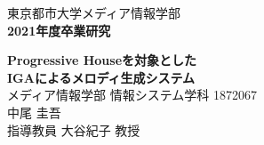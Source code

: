 \documentclass[fleqn,11pt]{jreport}
\begin{document}
\baselineskip 21.5pt

\begin{titlepage}
	\vspace*{3cm}
	\begin{center}
		{\Large\gt 東京都市大学メディア情報学部}\\
		\vspace*{0.5cm}
		{\Large\bf 2021年度卒業研究}\\
		\vspace{1.5cm}

		{\huge\bf Progressive Houseを対象とした}\\
		\vspace{0.5cm}
		{\huge\bf IGAによるメロディ生成システム}\\

		\vspace{9cm}
		{\Large メディア情報学部 情報システム学科 1872067}\\
		{\Large 中尾 圭吾}\\
		\vspace*{0.5cm}
		{\Large 指導教員 大谷紀子 教授}\\
	\end{center}
\end{titlepage}

\tableofcontents
\cleardoublepage












%


\appendix


\end{document}

